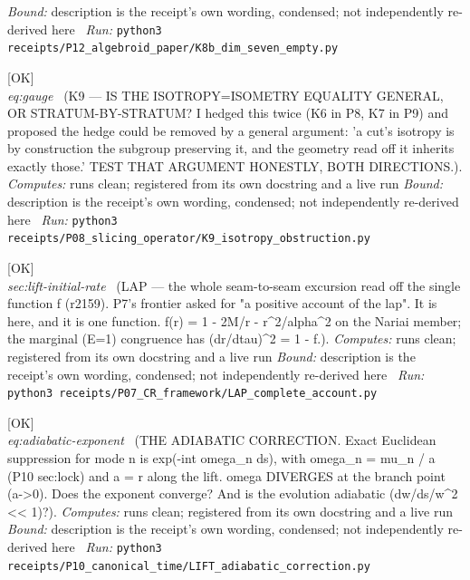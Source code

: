\begin{description}
 \emph{Bound:} description is the receipt's own wording, condensed; not independently re-derived here
\ \emph{Run:} \texttt{python3 receipts/P12\_algebroid\_paper/K8b\_dim\_seven\_empty.py}
\item[\label{rcpt:K9_isotropy_obstruction}\texttt{K9\_isotropy\_obstruction}]\hfill\textsf{[OK]}\\
\textit{eq:gauge} \ (K9 --- IS THE ISOTROPY=ISOMETRY EQUALITY GENERAL, OR STRATUM-BY-STRATUM? I hedged this twice (K6 in P8, K7 in P9) and proposed the hedge could be removed by a general argument: 'a cut's isotropy is by construction the subgroup preserving it, and the geometry read off it inherits exactly those.' TEST THAT ARGUMENT HONESTLY, BOTH DIRECTIONS.). 
\emph{Computes:} runs clean; registered from its own docstring and a live run
 \emph{Bound:} description is the receipt's own wording, condensed; not independently re-derived here
\ \emph{Run:} \texttt{python3 receipts/P08\_slicing\_operator/K9\_isotropy\_obstruction.py}
\item[\label{rcpt:LAP_complete_account}\texttt{LAP\_complete\_account}]\hfill\textsf{[OK]}\\
\textit{sec:lift-initial-rate} \ (LAP --- the whole seam-to-seam excursion read off the single function f (r2159). P7's frontier asked for "a positive account of the lap". It is here, and it is one function. f(r) = 1 - 2M/r - r\textasciicircum{}2/alpha\textasciicircum{}2 on the Nariai member; the marginal (E=1) congruence has (dr/dtau)\textasciicircum{}2 = 1 - f.). 
\emph{Computes:} runs clean; registered from its own docstring and a live run
 \emph{Bound:} description is the receipt's own wording, condensed; not independently re-derived here
\ \emph{Run:} \texttt{python3 receipts/P07\_CR\_framework/LAP\_complete\_account.py}
\item[\label{rcpt:LIFT_adiabatic_correction}\texttt{LIFT\_adiabatic\_correction}]\hfill\textsf{[OK]}\\
\textit{eq:adiabatic-exponent} \ (THE ADIABATIC CORRECTION. Exact Euclidean suppression for mode n is exp(-int omega\_n ds), with omega\_n = mu\_n / a (P10 sec:lock) and a = \textbar{}r\textbar{} along the lift. omega DIVERGES at the branch point (a->0). Does the exponent converge? And is the evolution adiabatic (\textbar{}dw/ds\textbar{}/w\textasciicircum{}2 << 1)?). 
\emph{Computes:} runs clean; registered from its own docstring and a live run
 \emph{Bound:} description is the receipt's own wording, condensed; not independently re-derived here
\ \emph{Run:} \texttt{python3 receipts/P10\_canonical\_time/LIFT\_adiabatic\_correction.py}

\end{description}
